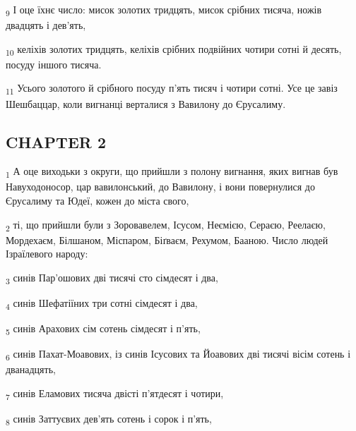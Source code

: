 \begin{tcolorbox}
\textsubscript{9} І оце їхнє число: мисок золотих тридцять, мисок срібних тисяча, ножів двадцять і дев'ять,
\end{tcolorbox}
\begin{tcolorbox}
\textsubscript{10} келіхів золотих тридцять, келіхів срібних подвійних чотири сотні й десять, посуду іншого тисяча.
\end{tcolorbox}
\begin{tcolorbox}
\textsubscript{11} Усього золотого й срібного посуду п'ять тисяч і чотири сотні. Усе це завіз Шешбаццар, коли вигнанці верталися з Вавилону до Єрусалиму.
\end{tcolorbox}
\subsection{CHAPTER 2}
\begin{tcolorbox}
\textsubscript{1} А оце виходьки з округи, що прийшли з полону вигнання, яких вигнав був Навуходоносор, цар вавилонський, до Вавилону, і вони повернулися до Єрусалиму та Юдеї, кожен до міста свого,
\end{tcolorbox}
\begin{tcolorbox}
\textsubscript{2} ті, що прийшли були з Зоровавелем, Ісусом, Неємією, Сераєю, Реелаєю, Мордехаєм, Білшаном, Міспаром, Біґваєм, Рехумом, Бааною. Число людей Ізраїлевого народу:
\end{tcolorbox}
\begin{tcolorbox}
\textsubscript{3} синів Пар'ошових дві тисячі сто сімдесят і два,
\end{tcolorbox}
\begin{tcolorbox}
\textsubscript{4} синів Шефатіїних три сотні сімдесят і два,
\end{tcolorbox}
\begin{tcolorbox}
\textsubscript{5} синів Арахових сім сотень сімдесят і п'ять,
\end{tcolorbox}
\begin{tcolorbox}
\textsubscript{6} синів Пахат-Моавових, із синів Ісусових та Йоавових дві тисячі вісім сотень і дванадцять,
\end{tcolorbox}
\begin{tcolorbox}
\textsubscript{7} синів Еламових тисяча двісті п'ятдесят і чотири,
\end{tcolorbox}
\begin{tcolorbox}
\textsubscript{8} синів Заттуєвих дев'ять сотень і сорок і п'ять,
\end{tcolorbox}
